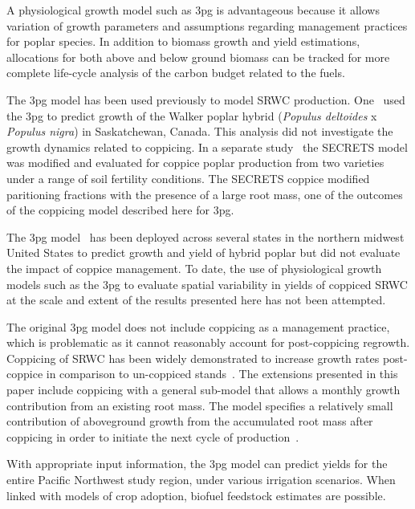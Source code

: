 \documentclass[preprint,12pt]{elsarticle}
\begin{document}
A physiological growth model such as \ac{3pg} is advantageous because
it allows variation of growth parameters and assumptions regarding
management practices for poplar species.  In addition to biomass
growth and yield estimations, allocations for both above and below
ground biomass can be tracked for more complete life-cycle analysis of
the carbon budget related to the fuels.

The \ac{3pg} model has been used previously to model \ac{SRWC}
production. One~\cite{Amichev2010} used the \ac{3pg} to predict growth
of the Walker poplar hybrid (\textit{Populus deltoides} x
\textit{Populus nigra}) in Saskatchewan, Canada. This analysis did not
investigate the growth dynamics related to coppicing. In a separate
study~\cite{Deckmyn2004} the \ac{SECRETS} model was modified and
evaluated for coppice poplar production from two varieties under a
range of soil fertility conditions.  The \ac{SECRETS} coppice modified
paritioning fractions with the presence of a large root mass, one of
the outcomes of the coppicing model described here for \ac{3pg}.

The \ac{3pg} model~\cite{Headlee2012} has been deployed across several
states in the northern midwest United States to predict growth and
yield of hybrid poplar but did not evaluate the impact of coppice
management.  To date, the use of physiological growth models such as
the \ac{3pg} to evaluate spatial variability in yields of coppiced
\ac{SRWC} at the scale and extent of the results presented here has
not been attempted.

The original \ac{3pg} model does not include coppicing as a management
practice, which is problematic as it cannot reasonably account for
post-coppicing regrowth.  Coppicing of \ac{SRWC} has been widely
demonstrated to increase growth rates post-coppice in comparison to
un-coppiced stands~\cite{Verwijst1996,Afas2008a,Sennerby-Forsse1992}.
The extensions presented in this paper include coppicing with a
general sub-model that allows a monthly growth contribution from an
existing root mass.  The model specifies a relatively small
contribution of aboveground growth from the accumulated root mass
after coppicing in order to initiate the next cycle of
production~\cite{Deckmyn2004}.

With appropriate input information, the \ac{3pg} model can predict
yields for the entire Pacific Northwest study region, under various
irrigation scenarios.  When linked with models of crop adoption,
biofuel feedstock estimates are possible.
\end{document}
